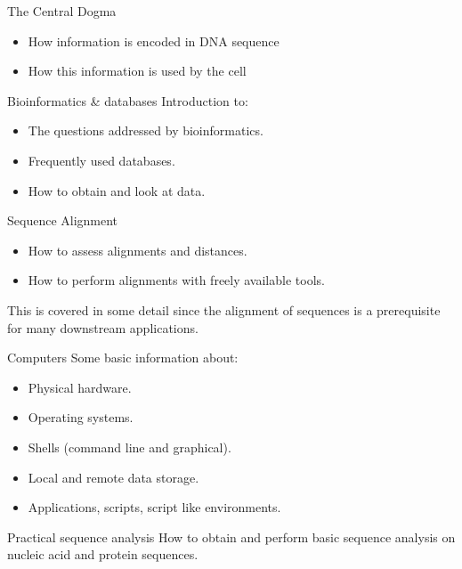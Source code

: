 \documentclass[pdf]{beamer}
\begin{document}
\begin{frame}{The Central Dogma}
  \begin{itemize}
    \item How information is encoded in DNA sequence
    \item How this information is used by the cell
  \end{itemize}  
\end{frame}

\begin{frame}{Bioinformatics \& databases}
  Introduction to:
  \begin{itemize}
    \item The questions addressed by bioinformatics.
    \item Frequently used databases.
    \item How to obtain and look at data.
  \end{itemize}
\end{frame}

\begin{frame}{Sequence Alignment}
  \begin{itemize}
    \item How to assess alignments and distances.
    \item How to perform alignments with freely available tools.
  \end{itemize}
  This is covered in some detail since the alignment of sequences is
  a prerequisite for many downstream applications.
\end{frame}

\begin{frame}{Computers}
  Some basic information about:
  \begin{itemize}
    \item Physical hardware.
    \item Operating systems.
    \item Shells (command line and graphical).
    \item Local and remote data storage.
    \item Applications, scripts, script like environments.
   \end{itemize}
\end{frame}

\begin{frame}{Practical sequence analysis}
  How to obtain and perform basic sequence analysis on 
  nucleic acid and protein sequences.
\end{frame}
\end{document}
